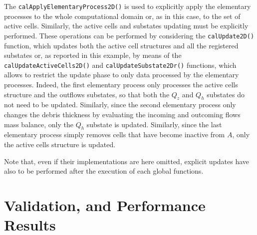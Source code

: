 \noindent The \verb'calApplyElementaryProcess2D()' is used to
explicitly apply the elementary processes to the whole
computational domain or, as in this case, to the set of active
cells. Similarly, the active cells and substates updating must be
explicitly performed. These operations can be performed by
considering the \verb'calUpdate2D()' function, which updates both
the active cell structures and all the registered substates or, as
reported in this example, by means of the
\verb'calUpdateActiveCells2D()' and \verb'calUpdateSubstate2Dr()'
functions, which allows to restrict the update phase to only data
processed by the elementary processes. Indeed, the first
elementary process only processes the active cells structure and
the outflows substates, so that both the $Q_z$ and $Q_h$ substates
do not need to be updated. Similarly, since the second elementary
process only changes the debris thickness by evaluating the
incoming and outcoming flows mass balance, only the $Q_h$ substate
is updated. Similarly, since the last elementary process simply
removes cells that have become inactive from $A$, only the active
cells structure is updated.

Note that, even if their implementations are here omitted,
explicit updates have also to be performed after the execution of
each global functions.







\section{Validation, and Performance Results}
\label{sec:computational-results}

